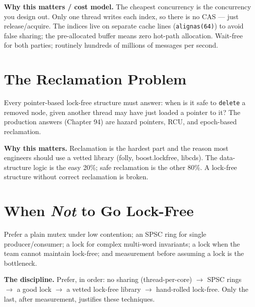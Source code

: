 \textbf{Why this matters / cost model.} The cheapest concurrency is the concurrency you design out. Only one thread writes each index, so there is no CAS --- just release/acquire. The indices live on separate cache lines (\texttt{alignas(64)}) to avoid false sharing; the pre-allocated buffer means zero hot-path allocation. Wait-free for both parties; routinely hundreds of millions of messages per second.

\section{The Reclamation Problem}
Every pointer-based lock-free structure must answer: when is it safe to \texttt{delete} a removed node, given another thread may have just loaded a pointer to it? The production answers (Chapter 94) are hazard pointers, RCU, and epoch-based reclamation.

\textbf{Why this matters.} Reclamation is the hardest part and the reason most engineers should use a vetted library (folly, boost.lockfree, libcds). The data-structure logic is the easy 20\%; safe reclamation is the other 80\%. A lock-free structure without correct reclamation is broken.

\section{When \emph{Not} to Go Lock-Free}
Prefer a plain mutex under low contention; an SPSC ring for single producer/consumer; a lock for complex multi-word invariants; a lock when the team cannot maintain lock-free; and measurement before assuming a lock is the bottleneck.

\textbf{The discipline.} Prefer, in order: no sharing (thread-per-core) $\rightarrow$ SPSC rings $\rightarrow$ a good lock $\rightarrow$ a vetted lock-free library $\rightarrow$ hand-rolled lock-free. Only the last, after measurement, justifies these techniques.
